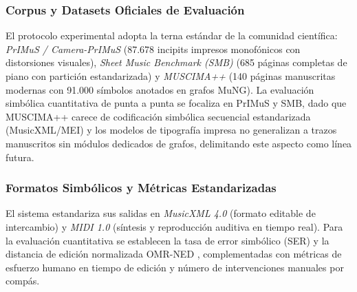 \subsubsection{Corpus y Datasets Oficiales de Evaluaci\'on}
El protocolo experimental adopta la terna est\'andar de la comunidad cient\'ifica: \emph{PrIMuS / Camera-PrIMuS} \cite{calvo2018} (87.678 incipits impresos monof\'onicos con distorsiones visuales), \emph{Sheet Music Benchmark (SMB)} \cite{smb2026} (685 p\'aginas completas de piano con partici\'on estandarizada) y \emph{MUSCIMA++} \cite{muscima2017} (140 p\'aginas manuscritas modernas con 91.000 s\'imbolos anotados en grafos MuNG). La evaluaci\'on simb\'olica cuantitativa de punta a punta se focaliza en PrIMuS y SMB, dado que MUSCIMA++ carece de codificaci\'on simb\'olica secuencial estandarizada (MusicXML/MEI) y los modelos de tipograf\'ia impresa no generalizan a trazos manuscritos sin m\'odulos dedicados de grafos, delimitando este aspecto como l\'inea futura.

\subsubsection{Formatos Simb\'olicos y M\'etricas Estandarizadas}
El sistema estandariza sus salidas en \emph{MusicXML 4.0} \cite{musicxml2021} (formato editable de intercambio) y \emph{MIDI 1.0} \cite{midi1996} (s\'intesis y reproducci\'on auditiva en tiempo real). Para la evaluaci\'on cuantitativa se establecen la tasa de error simb\'olico (SER) y la distancia de edici\'on normalizada OMR-NED \cite{smb2026}, complementadas con m\'etricas de esfuerzo humano en tiempo de edici\'on y n\'umero de intervenciones manuales por comp\'as.
